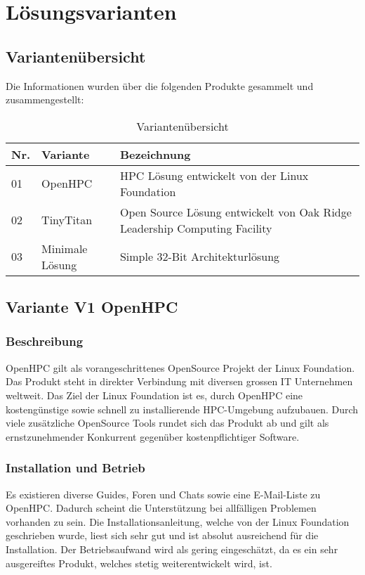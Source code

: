 
\section{Lösungsvarianten}
\subsection{Variantenübersicht}

Die Informationen wurden über die folgenden Produkte gesammelt und zusammengestellt:

\begin{table}[H]
\centering
\begin{tabular}{p{1cm}p{4cm}p{11cm}}
\hline
\rowcolor{heading} \textbf{Nr.} & \textbf{Variante} & \textbf{Bezeichnung} \\\hline
01 & OpenHPC & HPC Lösung entwickelt von der Linux Foundation \\\hline
02 & TinyTitan & Open Source Lösung entwickelt von Oak Ridge Leadership Computing Facility \\\hline
03 & Minimale Lösung & Simple 32-Bit Architekturlösung \\\hline
\end{tabular}
\caption{Variantenübersicht}
\end{table}

\subsection{Variante V1 \flqq OpenHPC\frqq}

\subsubsection{Beschreibung}
OpenHPC gilt als vorangeschrittenes OpenSource Projekt der Linux Foundation. Das Produkt steht in direkter Verbindung mit diversen grossen IT Unternehmen weltweit. Das Ziel der Linux Foundation ist es, durch OpenHPC eine kostengünstige sowie schnell zu installierende HPC-Umgebung aufzubauen. Durch viele zusätzliche OpenSource Tools rundet sich das Produkt ab und gilt als ernstzunehmender Konkurrent gegenüber kostenpflichtiger Software.

\subsubsection{Installation und Betrieb}
Es existieren diverse Guides, Foren und Chats sowie eine E-Mail-Liste zu OpenHPC. Dadurch scheint die Unterstützung bei allfälligen Problemen vorhanden zu sein. Die Installationsanleitung, welche von der Linux Foundation geschrieben wurde, liest sich sehr gut und ist absolut ausreichend für die Installation. Der Betriebsaufwand wird als gering eingeschätzt, da es ein sehr ausgereiftes Produkt, welches stetig weiterentwickelt wird, ist.

